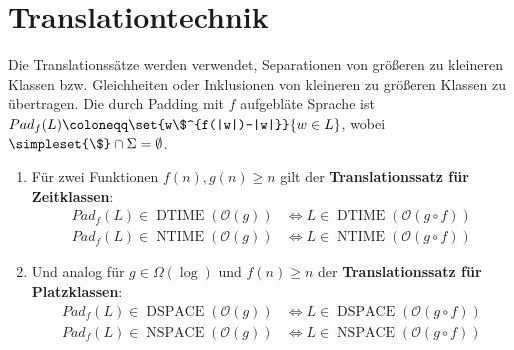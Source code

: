 \section{Translationtechnik}
Die Translationssätze werden verwendet, Separationen von größeren zu kleineren Klassen bzw. Gleichheiten oder Inklusionen von kleineren zu größeren Klassen zu übertragen.
Die durch Padding mit $f$ aufgebläte Sprache ist $Pad_f(L)\coloneqq \set{w\$^{f(|w|)-|w|}}{w\in L}$, wobei $\simpleset{\$}\cap\Sigma = \emptyset$.
\begin{enumerate}
	\item Für zwei Funktionen $f(n),g(n)\geq n$ gilt der \textbf{Translationssatz für Zeitklassen}:
	\begin{align*}
		Pad_f(L)\in \operatorname{DTIME}(\mathcal O(g))&\Leftrightarrow L\in \operatorname{DTIME}(\mathcal O(g\circ f))\\
		Pad_f(L)\in \operatorname{NTIME}(\mathcal O(g))&\Leftrightarrow L\in \operatorname{NTIME}(\mathcal O(g\circ f))
	\end{align*}
	\item Und analog für $g\in\Omega(\log)$ und $f(n)\geq n$ der \textbf{Translationssatz für Platzklassen}:
	\begin{align*}
		Pad_f(L)\in \operatorname{DSPACE}(\mathcal O(g))&\Leftrightarrow L\in \operatorname{DSPACE}(\mathcal O(g\circ f))\\
		Pad_f(L)\in \operatorname{NSPACE}(\mathcal O(g))&\Leftrightarrow L\in \operatorname{NSPACE}(\mathcal O(g\circ f))
	\end{align*}
\end{enumerate}
